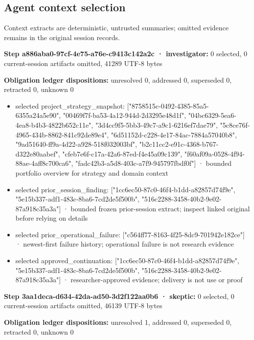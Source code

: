 \documentclass[11pt]{article}
\begin{document}
\subsection{Agent context selection}
Context extracts are deterministic, untrusted summaries; omitted evidence remains in the original session records.\par
\textbf{Step a886aba0-97cf-4e75-a76e-c9413c142a2c · investigator:} 0 selected, 0 current-session artifacts omitted, 41289 UTF-8 bytes\par
\textbf{Obligation ledger dispositions:} unresolved 0, addressed 0, superseded 0, retracted 0, unknown 0\par
\begin{itemize}
\item selected project\_strategy\_snapshot: ["8758515c-0492-4385-85a5-6355a24a5e90", "00469f7f-ba53-4a12-944d-2d3295e48d1f", "04bc6329-5ea6-4ea8-b4b3-4822b652c11e", "3d4cc9f5-5bb3-49c7-a9c1-6216ef7dae79", "5c8ce76f-4965-434b-8862-841c92de89e4", "6d51152d-c228-4e17-84ac-7884a57040b8", "9ad51640-ff9a-4d22-a928-518f032003bf", "b2c11cc2-e91c-4368-b767-d322e80aabef", "cfeb7e6f-c17a-42a6-87ed-f4e45a09c139", "f60af09a-0528-4f94-88ae-4aff8c700ca6", "fadc42b3-a5d8-403c-a7f9-945797fbdf0f"] · bounded portfolio overview for strategy and domain context
\item selected prior\_session\_finding: ["1cc6ec50-87c0-46f4-b1dd-a82857d74f9e", "5e15b337-adf1-483c-8ba6-7cd2de5f500b", "516c2288-3458-40b2-9e02-87a918c35a3a"] · bounded frozen prior-session extract; inspect linked original before relying on details
\item selected prior\_operational\_failure: ["c564ff77-8163-4f25-8dc9-701942e182ce"] · newest-first failure history; operational failure is not research evidence
\item selected approved\_continuation: ["1cc6ec50-87c0-46f4-b1dd-a82857d74f9e", "5e15b337-adf1-483c-8ba6-7cd2de5f500b", "516c2288-3458-40b2-9e02-87a918c35a3a"] · researcher-approved evidence; delivery is not use or proof
\end{itemize}
\textbf{Step 3aa1deca-d634-42da-ad50-3d2f122aa0b6 · skeptic:} 0 selected, 0 current-session artifacts omitted, 46139 UTF-8 bytes\par
\textbf{Obligation ledger dispositions:} unresolved 1, addressed 0, superseded 0, retracted 0, unknown 0\par
\end{document}
